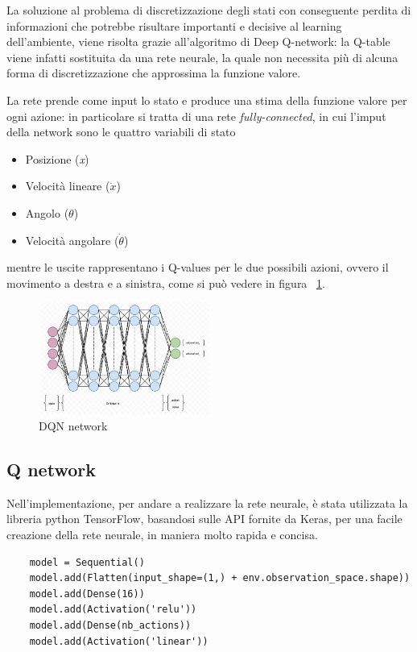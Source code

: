 La soluzione al problema di discretizzazione degli stati con conseguente perdita di informazioni che potrebbe risultare importanti e decisive al learning dell'ambiente, viene risolta grazie all'algoritmo di Deep Q-network: la Q-table viene infatti sostituita da una rete neurale, la quale non necessita più di alcuna forma di discretizzazione che approssima la funzione valore.

La rete prende come input lo stato e produce una stima della funzione valore per ogni azione: in particolare si tratta di una rete \textit{fully-connected}, in cui l'imput della network sono le quattro variabili di stato
\begin{itemize}
	\item Posizione (\textit{x})
	\item Velocità lineare ($\dot{x}$)
	\item Angolo ($\theta$)
	\item Velocità angolare ($\dot{\theta}$)
\end{itemize}
mentre le uscite rappresentano i Q-values per le due possibili azioni, ovvero il movimento a destra e a sinistra, come si può vedere in figura ~\ref{fig:DQN_network}.

\begin{figure}[!h]
	\centering
	\includegraphics[width=0.5\textwidth]{Immagini/DQN_network.JPG}
	\caption{DQN network}
	\label{fig:DQN_network}
\end{figure}

\subsection{Q network}
Nell'implementazione, per andare a realizzare la rete neurale, è stata utilizzata la libreria python TensorFlow, basandosi sulle API fornite da Keras, per una facile creazione della rete neurale, in maniera molto rapida e concisa.

\begin{lstlisting}
	model = Sequential()
	model.add(Flatten(input_shape=(1,) + env.observation_space.shape))
	model.add(Dense(16))
	model.add(Activation('relu'))
	model.add(Dense(nb_actions))
	model.add(Activation('linear'))
\end{lstlisting}


